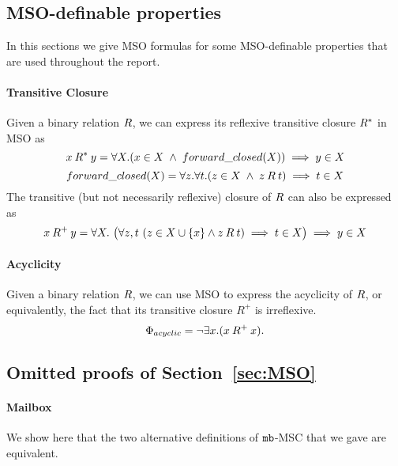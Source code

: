 
\subsection{MSO-definable properties}

In this sections we give MSO formulas for some MSO-definable properties that are used throughout the report.

\paragraph*{Transitive Closure}
Given a binary relation $\mathbin{R}$, we can express its reflexive transitive closure $\mathbin{R}^*$ in MSO as
\[
x \mathbin{R}^* y = \forall X.(x \in X \;\wedge\; forward\_closed(X)) \implies y \in X
\]
\[
forward\_closed(X) = \forall z.\forall t.(z \in X \;\wedge\; z \mathbin{R} t) \implies t \in X
\]
The transitive (but not necessarily reflexive) 
closure of $\mathbin{R}$ can also be expressed as
\[
    x \mathbin{R}^+ y = \forall X.\ \big(
        \forall z,t\ (z\in X\cup\{x\}\wedge z \mathbin{R} t)\implies t \in X\big) \implies y\in X
\]
        
\paragraph*{Acyclicity} 

Given a binary relation $\mathbin{R}$, we can use MSO to express the 
acyclicity of $\mathbin{R}$,
or equivalently, the fact that its transitive closure
$R^+$ is irreflexive.
\[
\Phi_{acyclic} =  \neg \exists x.(x \mathbin{R}^+ x).   
\]

\subsection{Omitted proofs of Section~\ref{sec:MSO}}\label{app:sec-mso}

\paragraph*{\bf Mailbox}

We show here that the two alternative definitions of $\mathtt{mb}$-MSC that we gave are equivalent.

